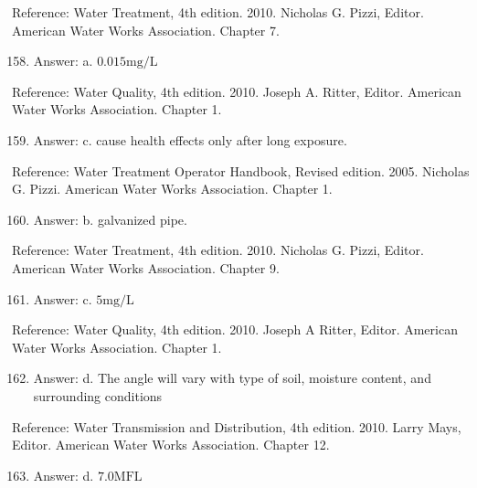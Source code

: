 \documentclass[10pt]{article}
\begin{document}
Reference: Water Treatment, 4th edition. 2010. Nicholas G. Pizzi, Editor. American Water Works Association. Chapter 7.

\begin{enumerate}
  \setcounter{enumi}{157}
  \item Answer: a. $0.015 \mathrm{mg} / \mathrm{L}$
\end{enumerate}

Reference: Water Quality, 4th edition. 2010. Joseph A. Ritter, Editor. American Water Works Association. Chapter 1.

\begin{enumerate}
  \setcounter{enumi}{158}
  \item Answer: c. cause health effects only after long exposure.
\end{enumerate}

Reference: Water Treatment Operator Handbook, Revised edition. 2005. Nicholas G. Pizzi. American Water Works Association. Chapter 1.

\begin{enumerate}
  \setcounter{enumi}{159}
  \item Answer: b. galvanized pipe.
\end{enumerate}

Reference: Water Treatment, 4th edition. 2010. Nicholas G. Pizzi, Editor. American Water Works Association. Chapter 9.

\begin{enumerate}
  \setcounter{enumi}{160}
  \item Answer: c. $5 \mathrm{mg} / \mathrm{L}$
\end{enumerate}

Reference: Water Quality, 4th edition. 2010. Joseph A Ritter, Editor. American Water Works Association. Chapter 1.

\begin{enumerate}
  \setcounter{enumi}{161}
  \item Answer: d. The angle will vary with type of soil, moisture content, and surrounding conditions
\end{enumerate}

Reference: Water Transmission and Distribution, 4th edition. 2010. Larry Mays, Editor. American Water Works Association. Chapter 12.

\begin{enumerate}
  \setcounter{enumi}{162}
  \item Answer: d. $7.0 \mathrm{MFL}$
\end{enumerate}
\end{document}
